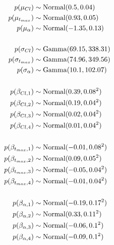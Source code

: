 \begin{align}
	p(\mu_{Cl}) & \sim \operatorname{Normal}(0.5, 0.04) \\
	p(\mu_{t_{max}}) & \sim \operatorname{Normal}(0.93, 0.05) \\
	p(\mu_\alpha) &\sim \operatorname{Normal}(-1.35, 0.13)\\
									\nonumber \\
	p(\sigma_{Cl}) &\sim \operatorname{Gamma}(69.15, 338.31)\\
	p(\sigma_{t_{max}}) &\sim \operatorname{Gamma}(74.96, 349.56)\\
	p(\sigma_{\alpha}) &\sim \operatorname{Gamma}(10.1, 102.07)\\
									\nonumber\\
	p(\beta_{Cl, 1}) &\sim \operatorname{Normal}(0.39, 0.08^2)\\
	p(\beta_{Cl, 2}) &\sim \operatorname{Normal}(0.19,0.04^2)\\
	p(\beta_{Cl, 3}) &\sim \operatorname{Normal}(0.02,0.04^2)\\
	p(\beta_{Cl, 4}) &\sim \operatorname{Normal}(0.01,0.04^2)\\
									\nonumber\\
	p(\beta_{t_{max}, 1}) &\sim \operatorname{Normal}(-0.01, 0.08^2)\\
	p(\beta_{t_{max}, 2}) &\sim \operatorname{Normal}(0.09,0.05^2)\\
	p(\beta_{t_{max}, 3}) &\sim \operatorname{Normal}(-0.05,0.04^2)\\
	p(\beta_{t_{max}, 4}) &\sim \operatorname{Normal}(-0.01,0.04^2)\\
										\nonumber\\
	p(\beta_{\alpha, 1}) &\sim \operatorname{Normal}(-0.19, 0.17^2)\\
	p(\beta_{\alpha, 2}) &\sim \operatorname{Normal}(0.33,0.11^2)\\
	p(\beta_{\alpha, 3}) &\sim \operatorname{Normal}(-0.06,0.1^2)\\
	p(\beta_{\alpha, 4}) &\sim \operatorname{Normal}(-0.09,0.1^2)\\
\end{align}


